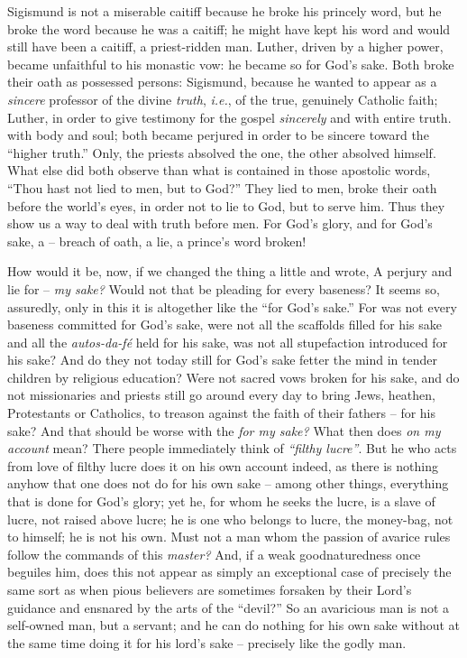 Sigismund is not a miserable caitiff because he broke his princely word, but 
he broke the word because he was a caitiff; he might have kept his word and 
would still have been a caitiff, a priest-ridden man. Luther, driven by a 
higher power, became unfaithful to his monastic vow: he became so for God's 
sake. Both broke their oath as possessed persons: Sigismund, because he wanted 
to appear as a \textit{sincere} professor of the divine \textit{truth}, 
\textit{i.e.}, of the true, genuinely Catholic faith; Luther, in order to 
give testimony for the gospel \textit{sincerely} and with entire truth. with 
body and soul; both became perjured in order to be sincere toward the 
``higher truth.'' Only, the priests absolved the one, the other absolved 
himself. What else did both observe than what is contained in those apostolic 
words, ``Thou hast not lied to men, but to God?'' They lied to men, broke 
their oath before the world's eyes, in order not to lie to God, but to serve 
him. Thus they show us a way to deal with truth before men. For God's glory, 
and for God's sake, a -- breach of oath, a lie, a prince's word broken!

How would it be, now, if we changed the thing a little and wrote, A perjury 
and lie for -- \textit{my sake?} Would not that be pleading for every 
baseness? It seems so, assuredly, only in this it is altogether like the 
``for God's sake.'' For was not every baseness committed for God's sake, 
were not all the scaffolds filled for his sake and all the 
\textit{autos-da-f\'e} held for his sake, was not all stupefaction introduced 
for his sake? And do they not today still for God's sake fetter the mind in 
tender children by religious education? Were not sacred vows broken for his 
sake, and do not missionaries and priests still go around every day to bring 
Jews, heathen, Protestants or Catholics, to treason against the faith of their 
fathers -- for his sake? And that should be worse with the \textit{for my 
sake?} What then does \textit{on my account} mean? There people immediately 
think of \textit{``filthy lucre''}. But he who acts from love of filthy 
lucre does it on his own account indeed, as there is nothing anyhow that one 
does not do for his own sake -- among other things, everything that is done 
for God's glory; yet he, for whom he seeks the lucre, is a slave of lucre, not 
raised above lucre; he is one who belongs to lucre, the money-bag, not to 
himself; he is not his own. Must not a man whom the passion of avarice rules 
follow the commands of this \textit{master?} And, if a weak goodnaturedness 
once beguiles him, does this not appear as simply an exceptional case of 
precisely the same sort as when pious believers are sometimes forsaken by 
their Lord's guidance and ensnared by the arts of the ``devil?'' So an 
avaricious man is not a self-owned man, but a servant; and he can do nothing 
for his own sake without at the same time doing it for his lord's sake -- 
precisely like the godly man.

